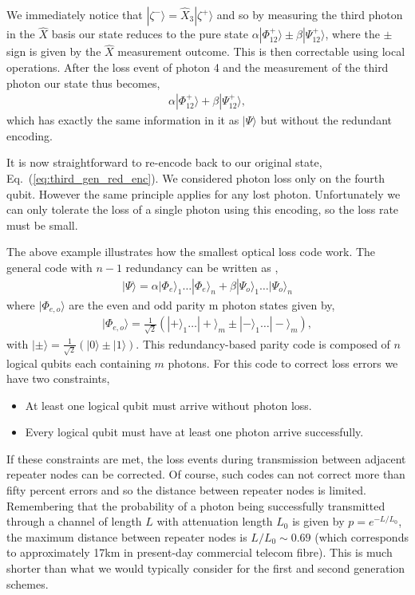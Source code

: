 We immediately notice that $|\zeta^-\rangle=\hat{X}_3 |\zeta^+\rangle$ and so by measuring the third photon in the $\hat{X}$ basis our state reduces to the pure state $\alpha |\Phi_{12}^+\rangle \pm \beta |\Psi_{12}^+\rangle$, where the $\pm$ sign is given by the $\hat{X}$ measurement outcome. This is then correctable using local operations. After the loss event of photon 4 and the measurement of the third photon our state thus becomes,
\begin{align}
\alpha |\Phi_{12}^+\rangle + \beta  |\Psi_{12}^+\rangle,
\end{align}
which has exactly the same information in it as $|\Psi\rangle$ but without the redundant encoding.

It is now straightforward to re-encode back to our original state, Eq.~(\ref{eq:third_gen_red_enc}). We considered photon loss only on the fourth qubit. However the same principle applies for any lost photon. Unfortunately we can only tolerate the loss of a single photon using this encoding, so the loss rate must be small.

The above example illustrates how the smallest optical loss code work. The general code with \mbox{$n - 1$} redundancy can be written as \cite{bib:ralph05, bib:munro12},
\begin{align}
|\Psi\rangle = \alpha |\Phi_{e}\rangle_1 \ldots  |\Phi_{{e}}\rangle_n+\beta |\Psi_{o}\rangle_1 \ldots  |\Psi_{o}\rangle_n
\end{align}
where $|\Phi_{e,o}\rangle$ are the even and odd parity m photon states given by,
\begin{align}
|\Phi_{e,o}\rangle = \frac{1}{\sqrt{2}}(|+\rangle_1 \ldots  |+\rangle_m\pm |-\rangle_1 \ldots  |-\rangle_m),
\end{align}
with \mbox{$|\pm\rangle=\frac{1}{\sqrt{2}}(|0\rangle\pm |1\rangle)$}. This redundancy-based parity code is composed of $n$ logical qubits each containing $m$ photons. For this code to correct loss errors we have two constraints,
\begin{itemize}
\item At least one logical qubit must arrive without photon loss.
\item Every logical qubit must have at least one photon arrive successfully.
\end{itemize}
If these constraints are met, the loss events during transmission between adjacent repeater nodes can be corrected. Of course, such codes can not correct more than fifty percent errors and so the distance between repeater nodes is limited. Remembering that the probability of a photon being successfully transmitted through a channel of length $L$ with attenuation length $L_0$ is given by \mbox{$p=e^{-L/L_0}$}, the maximum distance between repeater nodes is \mbox{$L/L_0\sim 0.69$} (which corresponds to approximately 17km in present-day commercial telecom fibre). This is much shorter than what we would typically consider for the first and second generation schemes.


